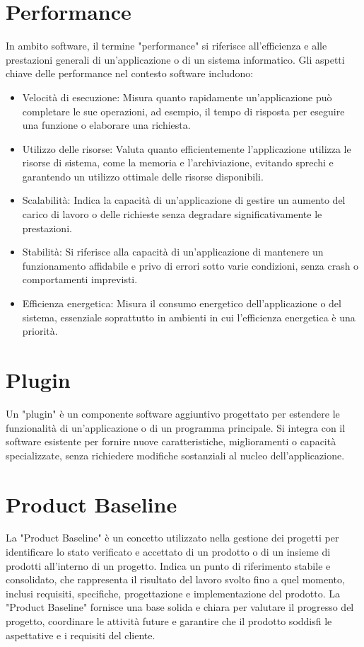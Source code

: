 \documentclass{article}
\begin{document}
\section{Performance}
In ambito software, il termine "performance" si riferisce all'efficienza e alle prestazioni generali di un'applicazione o di un sistema informatico. Gli aspetti chiave delle performance nel contesto software includono:
\begin{itemize}
    \item Velocità di esecuzione: Misura quanto rapidamente un'applicazione può completare le sue operazioni, ad esempio, il tempo di risposta per eseguire una funzione o elaborare una richiesta.
    \item Utilizzo delle risorse: Valuta quanto efficientemente l'applicazione utilizza le risorse di sistema, come la memoria e l'archiviazione, evitando sprechi e garantendo un utilizzo ottimale delle risorse disponibili.
    \item Scalabilità: Indica la capacità di un'applicazione di gestire un aumento del carico di lavoro o delle richieste senza degradare significativamente le prestazioni.
    \item Stabilità: Si riferisce alla capacità di un'applicazione di mantenere un funzionamento affidabile e privo di errori sotto varie condizioni, senza crash o comportamenti imprevisti.
    \item Efficienza energetica: Misura il consumo energetico dell'applicazione o del sistema, essenziale soprattutto in ambienti in cui l'efficienza energetica è una priorità.
\end{itemize}

\section{Plugin}
Un "plugin" è un componente software aggiuntivo progettato per estendere le funzionalità di un'applicazione o di un programma principale. Si integra con il software esistente per fornire nuove caratteristiche, miglioramenti o capacità specializzate, senza richiedere modifiche sostanziali al nucleo dell'applicazione. 

\section{Product Baseline}
La "Product Baseline" è un concetto utilizzato nella gestione dei progetti per identificare lo stato verificato e accettato di un prodotto o di un insieme di prodotti all'interno di un progetto. Indica un punto di riferimento stabile e consolidato, che rappresenta il risultato del lavoro svolto fino a quel momento, inclusi requisiti, specifiche, progettazione e implementazione del prodotto. La "Product Baseline" fornisce una base solida e chiara per valutare il progresso del progetto, coordinare le attività future e garantire che il prodotto soddisfi le aspettative e i requisiti del cliente.
\end{document}
